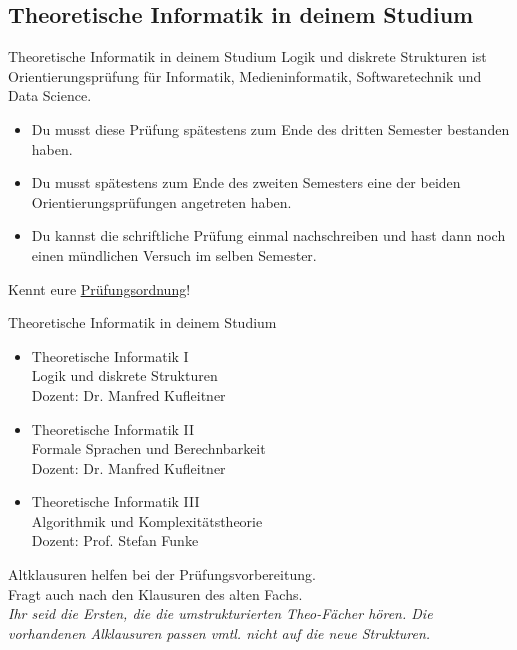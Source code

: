 \subsection{Theoretische Informatik in deinem Studium}
\begin{frame}[fragile]{Theoretische Informatik in deinem Studium}
    Logik und diskrete Strukturen ist Orientierungsprüfung für Informatik, Medieninformatik, Softwaretechnik und Data Science.
    \begin{itemize}
        \item Du musst diese Prüfung spätestens zum Ende des dritten Semester bestanden haben.
        \item Du musst spätestens zum Ende des zweiten Semesters eine der beiden Orientierungsprüfungen angetreten haben.
        \item Du kannst die schriftliche Prüfung einmal nachschreiben und hast dann noch einen mündlichen Versuch im selben Semester.
    \end{itemize}
    \alert{Kennt eure \href{https://www.student.uni-stuttgart.de/pruefungsorganisation/pruefungsordnung/}{\underline{Prüfungsordnung}}!}
\end{frame}

\begin{frame}{Theoretische Informatik in deinem Studium}
    \begin{itemize}
        \item Theoretische Informatik I\\
              Logik und diskrete Strukturen\\
              \quad Dozent: Dr. Manfred Kufleitner
        \item Theoretische Informatik II\\
              Formale Sprachen und Berechnbarkeit\\
              \quad Dozent: Dr. Manfred Kufleitner
        \item Theoretische Informatik III\\
              Algorithmik und Komplexitätstheorie\\
              \quad Dozent: Prof. Stefan Funke
    \end{itemize}
    \alert{Altklausuren helfen bei der Prüfungsvorbereitung. \\Fragt auch nach den Klausuren des alten Fachs.}\\
    \textit{Ihr seid die Ersten, die die umstrukturierten Theo-Fächer hören. Die vorhandenen Alklausuren passen vmtl. nicht auf die neue Strukturen.}
\end{frame}

